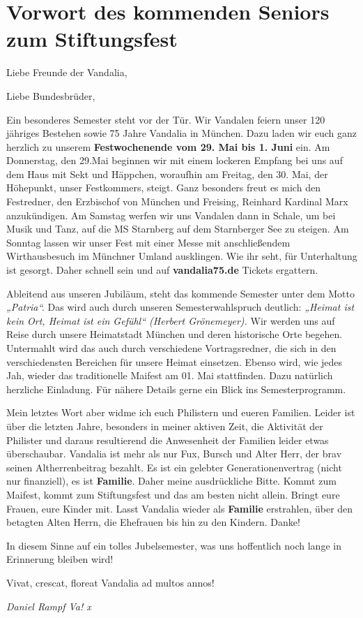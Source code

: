\section{Vorwort des kommenden Seniors zum Stiftungsfest}

Liebe Freunde der Vandalia,

Liebe Bundesbrüder,
\begin{multicols}{2}
Ein besonderes
Semester steht vor der Tür. Wir Vandalen feiern unser 120 jähriges Bestehen
sowie 75 Jahre Vandalia in München. Dazu laden wir euch ganz herzlich zu
unserem \textbf{Festwochenende vom 29. Mai bis 1. Juni} ein. Am Donnerstag, den
29.Mai beginnen wir mit einem lockeren Empfang bei uns auf dem Haus mit Sekt
und Häppchen, woraufhin am Freitag, den 30. Mai, der Höhepunkt, unser
Festkommers, steigt. Ganz besonders freut es mich den Festredner, den Erzbischof
von München und Freising, Reinhard Kardinal Marx anzukündigen. Am Samstag
werfen wir uns Vandalen dann in Schale, um bei Musik und Tanz, auf die MS
Starnberg auf dem Starnberger See zu steigen. Am Sonntag lassen wir unser Fest
mit einer Messe mit anschließendem Wirthausbesuch im Münchner Umland
ausklingen. Wie ihr seht, für Unterhaltung ist gesorgt. Daher schnell sein und auf
\textbf{vandalia75.de} Tickets ergattern.

Ableitend aus
unseren Jubiläum, steht das kommende Semester unter dem Motto \textit{„Patria“.} Das
wird auch durch unseren Semesterwahlspruch deutlich: \textit{„Heimat ist kein Ort,
Heimat ist ein Gefühl“ (Herbert Grönemeyer). }Wir werden uns auf Reise durch
unsere Heimatstadt München und deren historische Orte begehen. Untermahlt wird
das auch durch verschiedene Vortragsredner, die sich in den verschiedensten
Bereichen für unsere Heimat einsetzen. Ebenso wird, wie jedes Jah, wieder das
traditionelle Maifest am 01. Mai stattfinden. Dazu natürlich herzliche
Einladung. Für nähere Details gerne ein Blick ins Semesterprogramm.

Mein letztes Wort aber
widme ich euch Philistern und eueren Familien. Leider ist über die letzten
Jahre, besonders in meiner aktiven Zeit, die Aktivität der Philister und daraus
resultierend die Anwesenheit der Familien leider etwas überschaubar. Vandalia
ist mehr als nur Fux, Bursch und Alter Herr, der brav seinen Altherrenbeitrag
bezahlt. Es ist ein gelebter Generationenvertrag (nicht nur finanziell), es ist
\textbf{Familie}. Daher meine
ausdrückliche Bitte. Kommt zum Maifest, kommt zum Stiftungsfest und das am besten
nicht allein. Bringt eure Frauen, eure Kinder mit. Lasst Vandalia wieder als \textbf{Familie}
erstrahlen, über den betagten Alten Herrn, die Ehefrauen bis hin zu den
Kindern. Danke!

In diesem Sinne auf
ein tolles Jubelsemester, was uns hoffentlich noch lange in Erinnerung bleiben
wird!

Vivat, crescat, floreat Vandalia ad multos annos!

	\begin{flushright}
		\hfill\emph{Daniel Rampf Va! x}
	\end{flushright}
\end{multicols}

